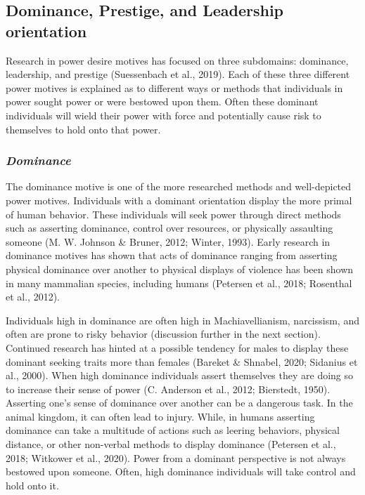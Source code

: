 \documentclass[
  donotrepeattitle,doc, 12pt, a4paper,floatsintext]{apa7}
\begin{document}
\hypertarget{dominance-prestige-and-leadership-orientation-1}{%
\subsection{Dominance, Prestige, and Leadership orientation}\label{dominance-prestige-and-leadership-orientation-1}}

Research in power desire motives has focused on three subdomains: dominance, leadership, and prestige (Suessenbach et al., 2019). Each of these three different power motives is explained as to different ways or methods that individuals in power sought power or were bestowed upon them. Often these dominant individuals will wield their power with force and potentially cause risk to themselves to hold onto that power.

\hypertarget{dominance}{%
\subsubsection{\texorpdfstring{\emph{Dominance}}{Dominance}}\label{dominance}}

The dominance motive is one of the more researched methods and well-depicted power motives. Individuals with a dominant orientation display the more primal of human behavior. These individuals will seek power through direct methods such as asserting dominance, control over resources, or physically assaulting someone (M. W. Johnson \& Bruner, 2012; Winter, 1993). Early research in dominance motives has shown that acts of dominance ranging from asserting physical dominance over another to physical displays of violence has been shown in many mammalian species, including humans (Petersen et al., 2018; Rosenthal et al., 2012).

Individuals high in dominance are often high in Machiavellianism, narcissism, and often are prone to risky behavior (discussion further in the next section). Continued research has hinted at a possible tendency for males to display these dominant seeking traits more than females (Bareket \& Shnabel, 2020; Sidanius et al., 2000). When high dominance individuals assert themselves they are doing so to increase their sense of power (C. Anderson et al., 2012; Bierstedt, 1950). Asserting one's sense of dominance over another can be a dangerous task. In the animal kingdom, it can often lead to injury. While, in humans asserting dominance can take a multitude of actions such as leering behaviors, physical distance, or other non-verbal methods to display dominance (Petersen et al., 2018; Witkower et al., 2020). Power from a dominant perspective is not always bestowed upon someone. Often, high dominance individuals will take control and hold onto it.
\end{document}
